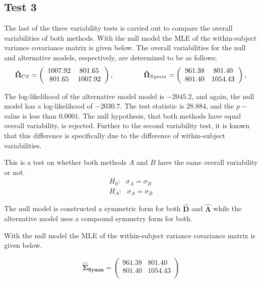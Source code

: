 \documentclass[12pt, a4paper]{report}
\theoremstyle{plain}
\theoremstyle{definition}
\theoremstyle{remark}
\begin{document}
\subsection{Test 3}
The last of the three variability tests is carried out to compare the overall variabilities of both methods.
With the null model the MLE of the within-subject variance covariance matrix is given below. The overall variabilities for the null and alternative models, respectively, are determined to be as follows;
\[
\boldsymbol{\hat{\Omega}}_{CS} = \left( \begin{array}{cc}
1007.92  & 801.65  \\
801.65  & 1007.92  \\
\end{array}\right),
\hspace{1.5cm}
\boldsymbol{\hat{\Omega}}_{Symm} = \left( \begin{array}{cc}
961.38 & 801.40  \\
801.40 & 1054.43  \\
\end{array}\right),
\]

The log-likelihood of the alternative model model is $-2045.2$, and again, the null model has a log-likelihood of $-2030.7$. The test statistic is $28.884$, and the $p-$value is less than $0.0001$. The null hypothesis, that both methods have equal overall variability, is rejected. Further to the second variability test, it is known that this difference is specifically due to the difference of within-subject variabilities.


This is a test on whether both methods $A$ and $B$ have the same overall variability or not.
\begin{eqnarray}
H_{0}: \mbox{ }\sigma_{A}  = \sigma_{B} \\
H_{A}: \mbox{ }\sigma_{A}  = \sigma_{B}
\end{eqnarray}

The null model is constructed a symmetric form for both $\boldsymbol{\hat{D}}$ and $\boldsymbol{\hat{\Lambda}}$ while the alternative model uses a compound symmetry form for both.


With the null model the MLE of the within-subject variance covariance matrix is given below.

\begin{equation}
\boldsymbol{\hat{\Sigma}_{Symm}} = \left( \begin{array}{cc}
961.38 & 801.40  \\
801.40 & 1054.43  \\
\end{array}\right)
\end{equation}
\end{document}

